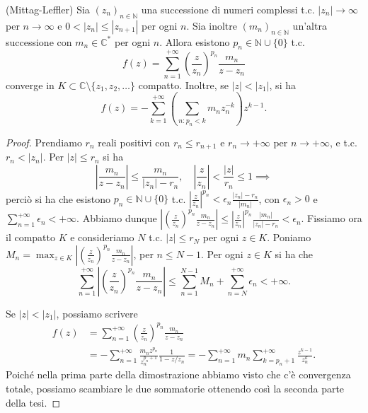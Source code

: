 \begin{lm} \label{mittagleffler}
  (Mittag-Leffler) Sia $(z_n)_{n \in \mathbb{N}}$ una successione di numeri complessi t.c. $|z_n| \longrightarrow \infty$ per $n \longrightarrow \infty$ e $0<|z_n| \le |z_{n+1}|$ per ogni $n$. Sia inoltre $(m_n)_{n \in \mathbb{N}}$ un'altra successione con $m_n \in \mathbb{C}^*$ per ogni $n$. Allora esistono $p_n \in \mathbb{N}\cup \{0\}$ t.c.
  $$f(z)=\sum_{n=1}^{+\infty} \left(\frac{z}{z_n}\right)^{p_n}\frac{m_n}{z-z_n}$$
  converge in $K \subset \mathbb{C}\setminus\{z_1, z_2, \dots\}$ compatto. Inoltre, se $|z|<|z_1|$, si ha
  $$f(z)=-\sum_{k=1}^{+\infty} \left(\sum_{n:p_n<k}m_nz_n^{-k}\right)z^{k-1}.$$
\end{lm}

\begin{proof}
  Prendiamo $r_n$ reali positivi con $r_n \le r_{n+1}$ e $r_n \longrightarrow +\infty$ per $n \longrightarrow +\infty$, e t.c. $r_n<|z_n|$. Per $|z| \le r_n$ si ha
  $$\left|\frac{m_n}{z-z_n}\right| \le \frac{m_n}{|z_n|-r_n}, \quad \left|\frac{z}{z_n}\right|<\frac{|z|}{r_n} \le 1 \implies$$
  perciò si ha che esistono $p_n \in \mathbb{N}\cup\{0\}$ t.c. $\displaystyle \left|\frac{z}{z_n}\right|^{p_n} <\epsilon_n \frac{|z_n|-r_n}{|m_n|}$, con $\epsilon_n>0$ e $\displaystyle \sum_{n=1}^{+\infty} \epsilon_n<+\infty$.
  Abbiamo dunque $\displaystyle \left|\left(\frac{z}{z_n}\right)^{p_n}\frac{m_n}{z-z_n}\right| \le \left|\frac{z}{z_n}\right|^{p_n} \frac{|m_n|}{|z_n|-r_n}<\epsilon_n$. Fissiamo ora il compatto $K$ e consideriamo $N$ t.c. $|z| \le r_N$ per ogni $z \in K$.
  Poniamo $\displaystyle M_n=\max_{z \in K} \left|\left(\frac{z}{z_n}\right)^{p_n}\frac{m_n}{z-z_n}\right|$, per $n \le N-1$. Per ogni $z \in K$ si ha che
  $$\sum_{n=1}^{+\infty} \left|\left(\frac{z}{z_n}\right)^{p_n}\frac{m_n}{z-z_n}\right| \le \sum_{n=1}^{N-1} M_n+\sum_{n=N}^{+\infty} \epsilon_n<+\infty.$$

  Se $|z|<|z_1|$, possiamo scrivere
  \begin{align*}
    f(z) & =\sum_{n=1}^{+\infty} \left(\frac{z}{z_n}\right)^{p_n}\frac{m_n}{z-z_n} \\
    & =-\sum_{n=1}^{+\infty} \frac{m_nz^{p_n}}{z_n^{p_n+1}}\frac{1}{1-z/z_n}=-\sum_{n=1}^{+\infty}m_n\sum_{k=p_n+1}^{+\infty} \frac{z^{k-1}}{z_n^k}.
  \end{align*}
  Poiché nella prima parte della dimostrazione abbiamo visto che c'è convergenza totale, possiamo scambiare le due sommatorie ottenendo così la seconda parte della tesi.
\end{proof}

